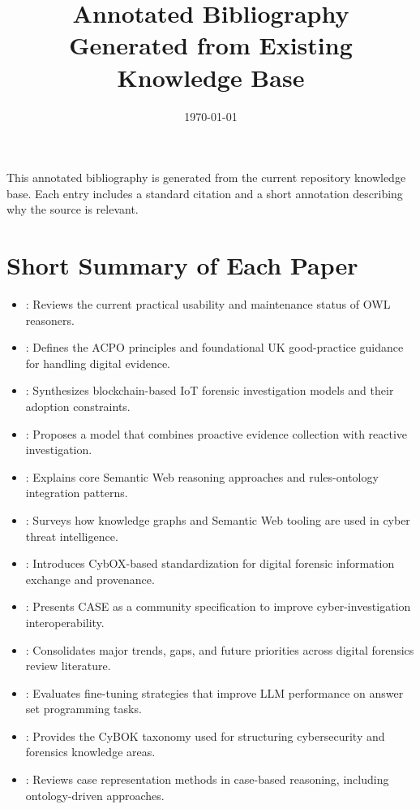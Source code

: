 \documentclass[11pt]{article}
\title{Annotated Bibliography\\\large Generated from Existing Knowledge Base}
\author{}
\date{\today}
\begin{document}
\maketitle

This annotated bibliography is generated from the current repository knowledge base.
Each entry includes a standard citation and a short annotation describing why the source is relevant.

\section*{Short Summary of Each Paper}
\begin{itemize}
  \item \textcite{abicht2023owl}: Reviews the current practical usability and maintenance status of OWL reasoners.
  \item \textcite{acpo2011gpgde}: Defines the ACPO principles and foundational UK good-practice guidance for handling digital evidence.
  \item \textcite{akinbi2022blockchainiot}: Synthesizes blockchain-based IoT forensic investigation models and their adoption constraints.
  \item \textcite{alharbi2011proactivereactive}: Proposes a model that combines proactive evidence collection with reactive investigation.
  \item \textcite{barahona2006reasoningweb}: Explains core Semantic Web reasoning approaches and rules-ontology integration patterns.
  \item \textcite{bratsas2024ctikg}: Surveys how knowledge graphs and Semantic Web tooling are used in cyber threat intelligence.
  \item \textcite{casey2015cybox}: Introduces CybOX-based standardization for digital forensic information exchange and provenance.
  \item \textcite{casey2017case}: Presents CASE as a community specification to improve cyber-investigation interoperability.
  \item \textcite{casino2022reviewofreviews}: Consolidates major trends, gaps, and future priorities across digital forensics review literature.
  \item \textcite{coppolillo2024llasp}: Evaluates fine-tuning strategies that improve LLM performance on answer set programming tasks.
  \item \textcite{cybok2021v110}: Provides the CyBOK taxonomy used for structuring cybersecurity and forensics knowledge areas.
  \item \textcite{elsappagh2015cbr}: Reviews case representation methods in case-based reasoning, including ontology-driven approaches.

\end{itemize}
\end{document}
